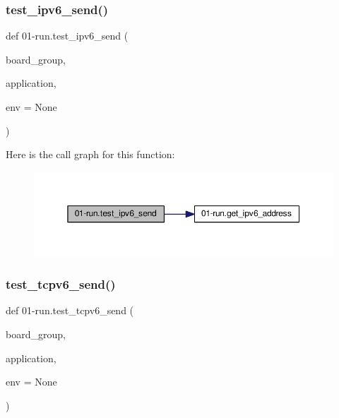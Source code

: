 \subsubsection{\texorpdfstring{test\+\_\+ipv6\+\_\+send()}{test\_ipv6\_send()}}
{\footnotesize\ttfamily def 01-\/run.\+test\+\_\+ipv6\+\_\+send (\begin{DoxyParamCaption}\item[{}]{board\+\_\+group,  }\item[{}]{application,  }\item[{}]{env = {\ttfamily None} }\end{DoxyParamCaption})}

Here is the call graph for this function\+:
\nopagebreak
\begin{figure}[H]
\begin{center}
\leavevmode
\includegraphics[width=350pt]{namespace01-run_a798e8a5d7092f930c4ca7ce48d658113_cgraph}
\end{center}
\end{figure}
\mbox{\label{namespace01-run_aa33fb8b27f2a329f22f50abe430854eb}} 
\subsubsection{\texorpdfstring{test\+\_\+tcpv6\+\_\+send()}{test\_tcpv6\_send()}}
{\footnotesize\ttfamily def 01-\/run.\+test\+\_\+tcpv6\+\_\+send (\begin{DoxyParamCaption}\item[{}]{board\+\_\+group,  }\item[{}]{application,  }\item[{}]{env = {\ttfamily None} }\end{DoxyParamCaption})}

